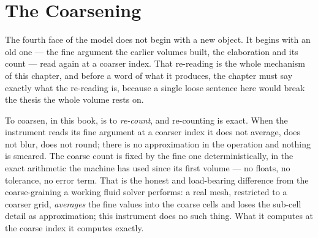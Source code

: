 \chapter{The Coarsening}

The fourth face of the model does not begin with a new object. It begins with an
old one --- the fine argument the earlier volumes built, the elaboration and its
count --- read again at a coarser index. That re-reading is the whole mechanism
of this chapter, and before a word of what it produces, the chapter must say
exactly what the re-reading is, because a single loose sentence here would break
the thesis the whole volume rests on.

To coarsen, in this book, is to \emph{re-count}, and re-counting is exact. When
the instrument reads its fine argument at a coarser index it does not average,
does not blur, does not round; there is no approximation in the operation and
nothing is smeared. The coarse count is fixed by the fine one deterministically,
in the exact arithmetic the machine has used since its first volume --- no floats,
no tolerance, no error term. That is the honest and load-bearing difference from
the coarse-graining a working fluid solver performs: a real mesh, restricted to a
coarser grid, \emph{averages} the fine values into the coarse cells and loses the
sub-cell detail as approximation; this instrument does no such thing. What it
computes at the coarse index it computes exactly.

